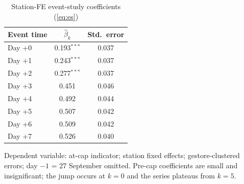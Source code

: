 \begin{table}[htbp]
\centering
\caption{Station-FE event-study coefficients (\cref{eq:es})}
\label{tab:es-coefs}
\begin{tabular}{lcc}
\toprule
Event time & $\hat\beta_k$ & Std.~error \\
\midrule
Day +0 & 0.193$^{***}$ & 0.037 \\
Day +1 & 0.243$^{***}$ & 0.037 \\
Day +2 & 0.277$^{***}$ & 0.037 \\
Day +3 & 0.451 & 0.046 \\
Day +4 & 0.492 & 0.044 \\
Day +5 & 0.507 & 0.042 \\
Day +6 & 0.509 & 0.042 \\
Day +7 & 0.526 & 0.040 \\
\bottomrule
\end{tabular}

\medskip
\footnotesize Dependent variable: at-cap indicator; station fixed
effects; gestore-clustered errors; day $-1$ = 27 September omitted.
Pre-cap coefficients are small and insignificant; the jump occurs at
$k=0$ and the series plateaus from $k=5$.
\end{table}
